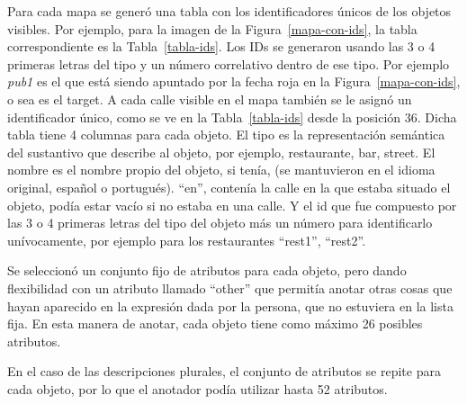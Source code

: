 Para cada mapa se gener\'o una tabla con los identificadores \'unicos de los objetos visibles. Por ejemplo, para la imagen de la Figura~\ref{mapa-con-ids}, la tabla correspondiente es la Tabla~\ref{tabla-ids}. Los IDs se generaron usando las 3 o 4 primeras letras del tipo y un n\'umero correlativo dentro de ese tipo. Por ejemplo {\it pub1} es el que est\'a siendo apuntado por la fecha roja en la Figura~\ref{mapa-con-ids}, o sea es el target. A cada calle visible en el mapa tambi\'en se le asign\'o un identificador \'unico, como se ve en la Tabla~\ref{tabla-ids} desde la posici\'on  36. Dicha tabla tiene 4 columnas para cada objeto. El tipo es la representaci\'on sem\'antica del sustantivo que describe al objeto, por ejemplo, restaurante, bar, street. El nombre es el nombre propio del objeto, si ten\'ia, (se mantuvieron en el idioma original, espa\~nol o portugu\'es). ``en'', conten\'ia la calle en la que estaba situado el objeto, pod\'ia estar vac\'io si no estaba en una calle. Y el id que  fue compuesto por las 3 o 4 primeras letras del tipo del objeto m\'as un n\'umero para identificarlo un\'ivocamente, por ejemplo para los restaurantes ``rest1'', ``rest2''.


Se seleccion\'o un conjunto fijo de atributos para cada objeto, pero dando flexibilidad con un atributo llamado ``other'' que permit\'ia anotar otras cosas que hayan aparecido en la expresi\'on dada por la persona, que no estuviera en la lista fija. En esta manera de anotar, cada objeto tiene como m\'aximo 26 posibles atributos.

En el caso de las descripciones plurales, el conjunto de atributos se repite para cada objeto, por lo que el anotador pod\'{i}a utilizar hasta 52 atributos.


